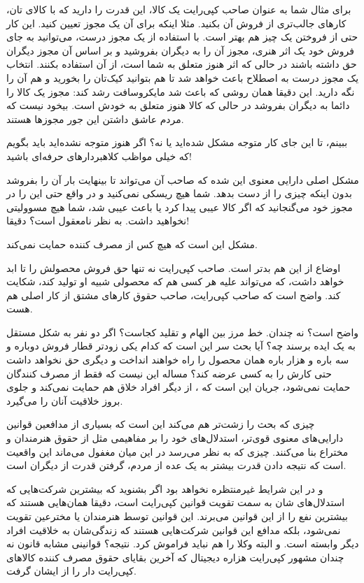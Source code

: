 برای مثال شما به عنوان صاحب کپی‌رایت یک کالا، این قدرت را دارید که با
کالای تان، کارهای جالب‌تری از فروش آن بکنید. مثلا اینکه برای آن یک مجوز
تعیین کنید. این کار حتی از فروختن‌ یک چیز هم بهتر است. با استفاده از یک
مجوز درست، می‌توانید به جای فروش خود یک اثر هنری، مجوز آن را به دیگران
بفروشید و بر اساس آن مجوز دیگران حق داشته باشند در حالی که اثر هنوز
متعلق به شما است، از آن استفاده‌ بکنند. انتخاب یک مجوز درست به اصطلاح
باعث خواهد شد تا هم بتوانید کیک‌تان را بخورید و هم آن را نگه‌ دارید. این
دقیقا همان روشی که باعث شد مایکروسافت رشد کند: مجوز یک کالا را دائما
به دیگران بفروشد در حالی که کالا هنوز متعلق به خودش است. بیخود نیست که
مردم عاشق داشتن این جور مجوزها هستند.

ببینم، تا این جای کار متوجه مشکل شده‌اید یا نه؟ اگر هنوز متوجه نشده‌اید
باید بگویم که خیلی مواظب کلاهبردارهای حرفه‌ای باشید!

مشکل اصلی دارایی معنوی این شده که صاحب آن می‌تواند تا بینهایت بار آن را
بفروشد بدون اینکه چیزی را از دست بدهد. شما هیچ ریسکی نمی‌کنید و در واقع
حتی این را در مجوز خود می‌گنجانید که اگر کالا عیبی پیدا کرد یا باعث
عیبی شد، شما هیچ مسوولیتی نخواهید داشت. به نظر نامعقول است؟ دقیقا!

مشکل این است که هیچ کس از مصرف کننده حمایت نمی‌کند.

اوضاع از این هم بدتر است. صاحب کپی‌رایت نه تنها حق فروش محصولش را تا
ابد خواهد داشت، که می‌تواند علیه هر کسی هم که محصولی شبیه او تولید کند،
شکایت کند. واضح است که صاحب کپی‌رایت، صاحب حقوق کارهای مشتق از کار اصلی
هم هست.

واضح است؟ نه چندان. خط مرز بین الهام و تقلید کجاست؟ اگر دو نفر به شکل
مستقل به یک ایده برسند چه؟ آیا بحث سر این است که کدام یکی زودتر قطار
فروش دوباره و سه باره و هزار باره همان محصول را راه خواهند انداخت و
دیگری حق نخواهد داشت حتی کارش را به کسی عرضه کند؟ مساله این نیست که
فقط از مصرف کنندگان حمایت نمی‌شود، جریان این است که ، از دیگر افراد خلاق هم حمایت نمی‌کند و جلوی بروز خلاقیت آنان
را می‌گیرد.

چیزی که بحث را زشت‌تر هم می‌کند این است که بسیاری از مدافعین قوانین
دارایی‌های معنوی قوی‌تر، استدلال‌های خود را بر مفاهیمی مثل 
از حقوق هنرمندان و مختراع بنا می‌کنند. چیزی که به نظر می‌رسد در این میان
مغفول می‌ماند این واقعیت است که نتیجه دادن قدرت بیشتر به یک عده از
مردم، گرفتن قدرت از دیگران است.

و در این شرایط غیرمنتظره نخواهد بود اگر بشنوید که بیشترین شرکت‌هایی که
استدلال‌های شان به سمت تقویت قوانین کپی‌رایت است، دقیقا همان‌هایی هستند
که بیشترین نفع را از این قوانین می‌برند. این قوانین توسط هنرمندان یا
مخترعین تقویت نمی‌شود، بلکه مدافع این قوانین شرکت‌هایی هستند که زندگی‌شان
به خلاقیت افراد دیگر وابسته است. و البته وکلا را هم نباید فراموش
کرد. نتیجه؟ قوانینی مشابه قانون نه چندان مشهور کپی‌رایت هزاره
دیجیتال که آخرین بقایای حقوق مصرف کننده کالاهای کپی‌رایت
دار را از ایشان گرفت.

